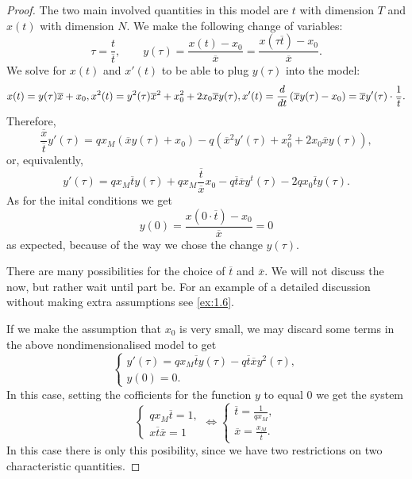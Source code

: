 \begin{proof}
  The two main involved quantities in this model are $t$ with dimension $T$ and
  $x(t)$ with dimension $N$. We make the following change of variables:
  \[
    \tau = \frac{t}{\overline{t}}, \qquad
    y(\tau) = \frac{x(t) - x_0}{\overline{x}} = \frac{x(\tau \overline{t}) - x_0}{\overline{x}}.
  \]
  We solve for $x(t)$ and $x'(t)$ to be able to plug $y(\tau)$ into the model:
  \[
    x(t) = y(\tau)\overline{x} + x_0,\\
    x^2(t) = y^2(\tau)\overline{x}^2 + x_0^2 + 2x_0\overline{x}y(\tau), \\
    x'(t) = \frac{d}{dt} \left( \overline{x}y(\tau) - x_0\right) = \overline{x} y'(\tau) \cdot \frac{1}{\overline{t}}.
  \]
  Therefore,
  \[
  \frac{\overline{x}}{\overline{t}}y'(\tau) =
  qx_M \left(\overline{x}y(\tau) + x_0\right)
  - q\left(\overline{x}^2y'(\tau) + x_0^2 + 2x_0\overline{x}y(\tau)\right),
  \]
  or, equivalently,
  \[
    y'(\tau) = qx_M \overline{t} y(\tau) +
    qx_M \frac{\overline{t}}{\overline{x}} x_0
    - q \overline{t} \overline{x} y^t(\tau)
    - 2q x_0 \overline{t} y(\tau).
  \]
  As for the inital conditions we get
  \[
    y(0) = \frac{x(0 \cdot \overline{t}) - x_0}{\overline{x}} = 0
  \]
  as expected, because of the way we chose the change $y(\tau)$.

  There are many possibilities for the choice of $\overline{t}$ and
  $\overline{x}$. We will not discuss the now, but rather wait until part be.
  For an example of a detailed discussion without making extra assumptions see
  \autoref{ex:1.6}.

  If we make the assumption that $x_0$ is very small, we may discard some terms
  in the above nondimensionalised model to get
  \[
    \begin{cases}
      y'(\tau) = qx_M \overline{t} y(\tau) - q \overline{t} \overline{x} y^2(\tau), \\
      y(0) = 0.
    \end{cases}
  \]
  In this case, setting the cofficients for the function $y$ to equal $0$ we
  get the system
  \[
  \begin{cases}
    qx_M \overline{t} = 1, \\
    x\overline{t} \overline{x} = 1
  \end{cases}
  \iff
  \begin{cases}
    \overline{t} = \frac{1}{q x_M}, \\
    \overline{x} = \frac{x_M}{\overline{t}}.
  \end{cases}
  \]
  In this case there is only this posibility, since we have two restrictions on
  two characteristic quantities.
  
\end{proof}


